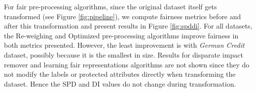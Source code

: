 \documentclass{article}
\begin{document}
For fair pre-processing algorithms, since the original dataset itself gets transformed (see Figure \ref{fig:pipeline}), we compute fairness metrics before and after this transformation and present results in Figure \ref{fig:spddi}. For all datasets, the Re-weighing and Optimized pre-processing algorithms improve fairness in both metrics presented. However, the least improvement is with \textit{German Credit} dataset, possibly because it is the smallest in size. Results for disparate impact remover and learning fair representations algorithms are not shown since they do not modify the labels or protected attributes directly when transforming the dataset. Hence the SPD and DI values do not change during transformation.




\end{document}
